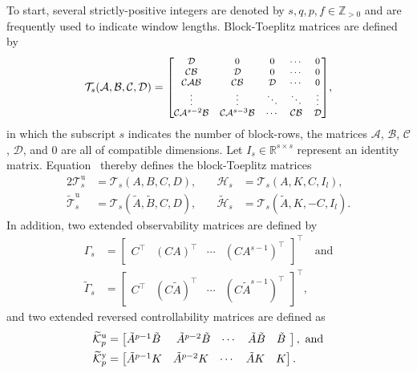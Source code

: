 To start, several strictly-positive integers are denoted by $s,q,p,f\in\mathbb{Z}_{>0}$ and are frequently used to indicate window lengths. Block-Toeplitz matrices are defined by
\begin{align}\label{eqn:blockToeplitz} 
\mathcal{T}_s(\mathcal{A},\mathcal{B},\mathcal{C},\mathcal{D}) =\scriptsize{
	\begin{bmatrix}
		\mathcal{D}         & 0         & 0      & \cdots  & 0\\
		\mathcal{C}\mathcal{B}        & \mathcal{D}         & 0      & \cdots  & 0\\
		\mathcal{C}\mathcal{A}\mathcal{B}       & \mathcal{C}\mathcal{B}        & \mathcal{D}      & \cdots & 0\\
		\vdots    &  \vdots & \ddots & \ddots & \vdots\\
		\mathcal{C}\mathcal{A}^{s-2}\mathcal{B} & \mathcal{C}\mathcal{A}^{s-3}\mathcal{B} & \cdots  & \mathcal{C}\mathcal{B}     & \mathcal{D}
	\end{bmatrix}},
\end{align}
in which the subscript $s$ indicates the number of block-rows, the matrices $\mathcal{A}$, $\mathcal{B}$, $\mathcal{C}$, $\mathcal{D}$, and $0$ are all of compatible dimensions. Let ${I_s\in\mathbb{R}^{s\times s}}$ represent an identity matrix. Equation~ thereby defines the block-Toeplitz matrices
\begin{alignat*}{2}
\mathcal{T}_s^\mathrm{u}&=\mathcal{T}_s(A,B,C,D),\quad  &\mathcal{H}_s&=\mathcal{T}_s(A,K,C,I_l),\\
\widetilde{\mathcal{T}}_s^\mathrm{u}&=\mathcal{T}_s(\tilde{A},\tilde{B},C,D),\quad  &\widetilde{\mathcal{H}}_s&=\mathcal{T}_s(\tilde{A},K,-C,I_l).
\end{alignat*}
%
In addition, two extended observability matrices are defined by
\begin{align*}
\Gamma_s &= \begin{bmatrix}C^\top & (CA)^\top & \cdots & (CA^{s-1})^\top\end{bmatrix}^\top\quad\text{and}\\
\widetilde{\Gamma}_s &= \begin{bmatrix}C^\top & (C\tilde{A})^\top & \cdots & (C\tilde{A}^{s-1})^\top\end{bmatrix}^\top,
\end{align*}
and two extended reversed controllability matrices are defined as 
\begin{align*}
\widetilde{\mathcal{K}}_{p}^{\mathrm{{u}}} &= \begin{bmatrix} \tilde{A}^{p-1}\tilde{B}\:\, & \tilde{A}^{p-2}\tilde{B} & \cdots & \tilde{A}\tilde{B} & \tilde{B}\:\, \end{bmatrix},\text{ and}\\
\widetilde{\mathcal{K}}_{p}^{\mathrm{{y}}} &= \begin{bmatrix} \tilde{A}^{p-1}K & \tilde{A}^{p-2}K & \cdots & \tilde{A}K & K \end{bmatrix}.
\end{align*}
